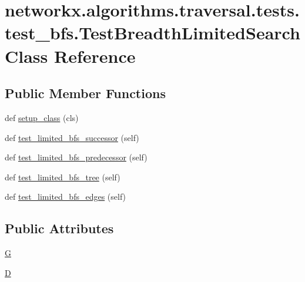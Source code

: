 \hypertarget{classnetworkx_1_1algorithms_1_1traversal_1_1tests_1_1test__bfs_1_1TestBreadthLimitedSearch}{}\section{networkx.\+algorithms.\+traversal.\+tests.\+test\+\_\+bfs.\+Test\+Breadth\+Limited\+Search Class Reference}
\label{classnetworkx_1_1algorithms_1_1traversal_1_1tests_1_1test__bfs_1_1TestBreadthLimitedSearch}
\subsection*{Public Member Functions}
\begin{DoxyCompactItemize}
\item 
def \hyperlink{classnetworkx_1_1algorithms_1_1traversal_1_1tests_1_1test__bfs_1_1TestBreadthLimitedSearch_a65409b40f1a629e0b6d97b7e6de585f5}{setup\+\_\+class} (cls)
\item 
def \hyperlink{classnetworkx_1_1algorithms_1_1traversal_1_1tests_1_1test__bfs_1_1TestBreadthLimitedSearch_acf77f82f978e8e74155d68be802d591e}{test\+\_\+limited\+\_\+bfs\+\_\+successor} (self)
\item 
def \hyperlink{classnetworkx_1_1algorithms_1_1traversal_1_1tests_1_1test__bfs_1_1TestBreadthLimitedSearch_a5a8ba9dee46c89c16530593a9d15ff8b}{test\+\_\+limited\+\_\+bfs\+\_\+predecessor} (self)
\item 
def \hyperlink{classnetworkx_1_1algorithms_1_1traversal_1_1tests_1_1test__bfs_1_1TestBreadthLimitedSearch_a4960c9b32d0630f49774c157c5b82d84}{test\+\_\+limited\+\_\+bfs\+\_\+tree} (self)
\item 
def \hyperlink{classnetworkx_1_1algorithms_1_1traversal_1_1tests_1_1test__bfs_1_1TestBreadthLimitedSearch_a58d1eee795259fedd961f16f94449df9}{test\+\_\+limited\+\_\+bfs\+\_\+edges} (self)
\end{DoxyCompactItemize}
\subsection*{Public Attributes}
\begin{DoxyCompactItemize}
\item 
\hyperlink{classnetworkx_1_1algorithms_1_1traversal_1_1tests_1_1test__bfs_1_1TestBreadthLimitedSearch_a47d0b2f2344cd0b6adbddd44605f8fd7}{G}
\item 
\hyperlink{classnetworkx_1_1algorithms_1_1traversal_1_1tests_1_1test__bfs_1_1TestBreadthLimitedSearch_a790780a66c33685882403c4a3d49940f}{D}
\end{DoxyCompactItemize}



